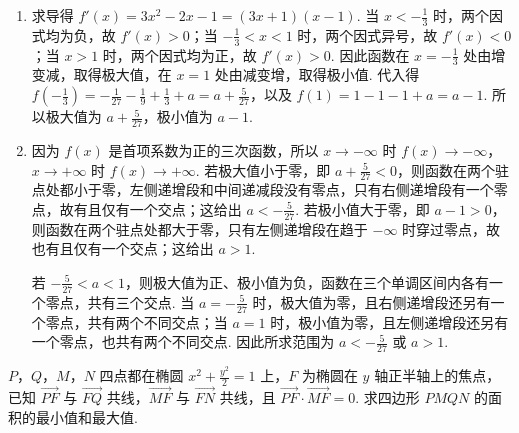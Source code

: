 \begin{solution}
\begin{enumerate}
\item 求导得 \(f'(x)=3x^{2}-2x-1=(3x+1)(x-1)\). 当 \(x<-\frac13\) 时，两个因式均为负，故 \(f'(x)>0\)；当 \(-\frac13<x<1\) 时，两个因式异号，故 \(f'(x)<0\)；当 \(x>1\) 时，两个因式均为正，故 \(f'(x)>0\). 因此函数在 \(x=-\frac13\) 处由增变减，取得极大值，在 \(x=1\) 处由减变增，取得极小值. 代入得 \(f\left(-\frac13\right)=-\frac1{27}-\frac19+\frac13+a=a+\frac5{27}\)，以及 \(f(1)=1-1-1+a=a-1\). 所以极大值为 \(a+\frac5{27}\)，极小值为 \(a-1\).
\item 因为 \(f(x)\) 是首项系数为正的三次函数，所以 \(x\to-\infty\) 时 \(f(x)\to-\infty\)，\(x\to+\infty\) 时 \(f(x)\to+\infty\). 若极大值小于零，即 \(a+\frac5{27}<0\)，则函数在两个驻点处都小于零，左侧递增段和中间递减段没有零点，只有右侧递增段有一个零点，故有且仅有一个交点；这给出 \(a<-\frac5{27}\). 若极小值大于零，即 \(a-1>0\)，则函数在两个驻点处都大于零，只有左侧递增段在趋于 \(-\infty\) 时穿过零点，故也有且仅有一个交点；这给出 \(a>1\).

若 \(-\frac5{27}<a<1\)，则极大值为正、极小值为负，函数在三个单调区间内各有一个零点，共有三个交点. 当 \(a=-\frac5{27}\) 时，极大值为零，且右侧递增段还另有一个零点，共有两个不同交点；当 \(a=1\) 时，极小值为零，且左侧递增段还另有一个零点，也共有两个不同交点. 因此所求范围为 \(a<-\frac5{27}\) 或 \(a>1\).
\end{enumerate}
\end{solution}

\begin{problem}
\(P\)，\(Q\)，\(M\)，\(N\) 四点都在椭圆 \(x^{2} + \frac{y^{2}}{2} = 1\) 上，\(F\) 为椭圆在 \(y\) 轴正半轴上的焦点，已知 \(\overrightarrow{PF}\) 与 \(\overrightarrow{FQ}\) 共线，\(\overrightarrow{MF}\) 与 \(\overrightarrow{FN}\) 共线，且 \(\overrightarrow{PF} \cdot \overrightarrow{MF} = 0\). 求四边形 \(PMQN\) 的面积的最小值和最大值.
\end{problem}

